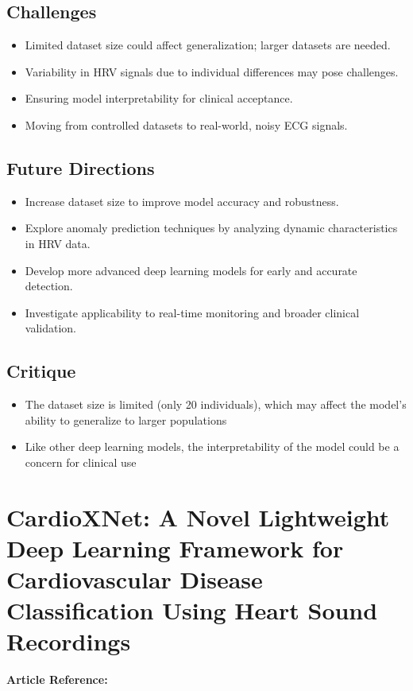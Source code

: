 \subsection*{Challenges}
\begin{itemize}
    \item Limited dataset size could affect generalization; larger datasets are needed.
    \item Variability in HRV signals due to individual differences may pose challenges.
    \item Ensuring model interpretability for clinical acceptance.
    \item Moving from controlled datasets to real-world, noisy ECG signals.
\end{itemize}

\subsection*{Future Directions}
\begin{itemize}
    \item Increase dataset size to improve model accuracy and robustness.
    \item Explore anomaly prediction techniques by analyzing dynamic characteristics in HRV data.
    \item Develop more advanced deep learning models for early and accurate detection.
    \item Investigate applicability to real-time monitoring and broader clinical validation.
\end{itemize}

\subsection*{Critique}
\begin{itemize}
    \item The dataset size is limited (only 20 individuals), which may affect the model's ability to generalize to larger populations
    \item Like other deep learning models, the interpretability of the model could be a concern for clinical use
\end{itemize}


\section{CardioXNet: A Novel Lightweight Deep Learning Framework for Cardiovascular Disease Classification Using Heart Sound Recordings}
\textbf{Article Reference:} \cite{shuvoCardioXNetNovelLightweight2021}

